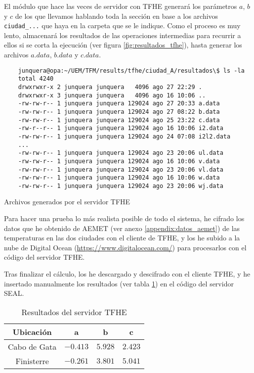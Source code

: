 El módulo que hace las veces de servidor con TFHE generará los parámetros $a$, $b$ y $c$ de los que llevamos hablando toda la sección en base a los archivos \verb|ciudad_...| que haya en la carpeta que se le indique. Como el proceso es muy lento, almacenará los resultados de las operaciones intermedias para recurrir a ellos si se corta la ejecución (ver figura \ref{fig:resultados_tfhe}), hasta generar los archivos $a.data$, $b.data$ y $c.data$.

\begin{listing}[ht]
    \begin{verbatim}
    junquera@opa:~/UEM/TFM/results/tfhe/ciudad_A/resultados\$ ls -la
    total 4240
    drwxrwxr-x 2 junquera junquera   4096 ago 27 22:29 .
    drwxrwxr-x 3 junquera junquera   4096 ago 16 10:06 ..
    -rw-rw-r-- 1 junquera junquera 129024 ago 27 20:33 a.data
    -rw-rw-r-- 1 junquera junquera 129024 ago 27 08:22 b.data
    -rw-rw-r-- 1 junquera junquera 129024 ago 25 23:22 c.data
    -rw-r--r-- 1 junquera junquera 129024 ago 16 10:06 i2.data
    -rw-rw-r-- 1 junquera junquera 129024 ago 24 07:08 i2l2.data
    ...
    -rw-rw-r-- 1 junquera junquera 129024 ago 23 20:06 ul.data
    -rw-rw-r-- 1 junquera junquera 129024 ago 16 10:06 v.data
    -rw-rw-r-- 1 junquera junquera 129024 ago 23 20:06 vl.data
    -rw-rw-r-- 1 junquera junquera 129024 ago 16 10:06 w.data
    -rw-rw-r-- 1 junquera junquera 129024 ago 23 20:06 wj.data
    \end{verbatim}
    \caption{Archivos generados por el servidor TFHE} \label{fig:resultados_tfhe}
\end{listing}

Para hacer una prueba lo más realista posible de todo el sistema, he cifrado los datos que he obtenido de AEMET (ver anexo \ref{appendix:datos_aemet}) de las temperaturas en las dos ciudades con el cliente de TFHE, y los he subido a la nube de Digital Ocean (\url{https://www.digitalocean.com/}) para procesarlos con el código del servidor TFHE.

Tras finalizar el cálculo, los he descargado y descifrado con el cliente TFHE, y he insertado manualmente los resultados (ver tabla \ref{table:r2_cg_ft}) en el código del servidor SEAL.

\begin{table}[]
    \centering
    \begin{tabular}{c c c c}
        Ubicación  & a & b & c \\
        \hline \hline 
        Cabo de Gata    & $-0.413$ & $5.928$ & $2.423$ \\
        Finisterre    & $-0.261$ & $3.801$ & $5.041$
    \end{tabular}
    \caption{Resultados del servidor TFHE}
    \label{table:r2_cg_ft}
\end{table}

